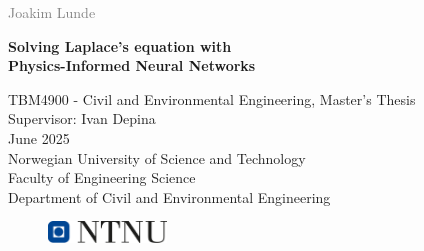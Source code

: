 \documentclass[a4paper, 12pt,twoside,fleqn]{book}
\begin{document}

\begin{titlepage}
  \vspace*{1.5cm}

  \noindent  \textcolor{gray}{\large Joakim Lunde} \\
  \vspace{1cm}

  \noindent \textbf{\LARGE Solving Laplace's equation with\\ Physics-Informed Neural Networks \\}

  \vfill  %

  \noindent TBM4900 - Civil and Environmental Engineering, Master's Thesis \\
  Supervisor: Ivan Depina \\
  June 2025 \\

  \vspace{0.8cm}
  \noindent
  Norwegian University of Science and Technology \\
  Faculty of Engineering Science \\
  Department of Civil and Environmental Engineering \\
  \vspace{0.8cm}

  \begin{figure}[h]
    \includegraphics[width=0.28\textwidth]{Figures/ntnu_basic.png}
  \end{figure}
\end{titlepage}





\tableofcontents
{}

\listoffigures
{}

\listoftables
{}

\printglossary[title=Glossary, toctitle=Glossary]


\cleardoublepage
{}
 










\chapter*{\bibname}
\printbibliography[heading=none]
\cleardoublepage

% 
\end{document}
